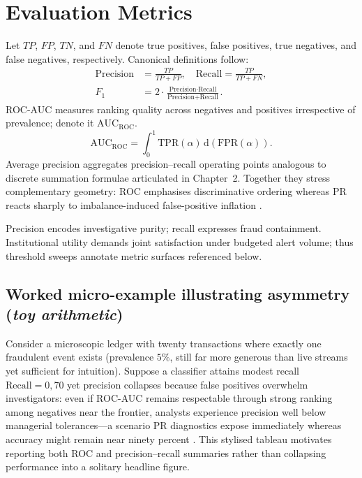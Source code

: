 \section{Evaluation Metrics}
Let $TP$, $FP$, $TN$, and $FN$ denote true positives, false positives, true negatives, and false negatives, respectively. Canonical definitions follow:
\begin{equation}
\begin{aligned}
\text{Precision} &= \frac{TP}{TP + FP},\quad
\text{Recall} = \frac{TP}{TP + FN},\\
F_1 &= 2 \cdot \frac{\text{Precision} \cdot \text{Recall}}{\text{Precision} + \text{Recall}} .
\end{aligned}
\end{equation}
ROC-AUC measures ranking quality across negatives and positives irrespective of prevalence; denote it $\mathrm{AUC}_{\mathrm{ROC}}$.
\begin{equation}
\mathrm{AUC}_{\mathrm{ROC}} = \int_0^1 \text{TPR}(\alpha)\, \mathrm{d}(\text{FPR}(\alpha)) .
\end{equation}
Average precision aggregates precision--recall operating points analogous to discrete summation formulae articulated in Chapter~2. Together they stress complementary geometry: ROC emphasises discriminative ordering whereas PR reacts sharply to imbalance-induced false-positive inflation \cite{fraud_handbook}.

Precision encodes investigative purity; recall expresses fraud containment. Institutional utility demands joint satisfaction under budgeted alert volume; thus threshold sweeps annotate metric surfaces referenced below.

\subsection{Worked micro-example illustrating asymmetry (\emph{toy arithmetic})}
Consider a microscopic ledger with twenty transactions where exactly one fraudulent event exists (prevalence $5\%$, still far more generous than live streams yet sufficient for intuition). Suppose a classifier attains modest recall $\text{Recall}=0{,}70$ yet precision collapses because false positives overwhelm investigators: even if ROC-AUC remains respectable through strong ranking among negatives near the frontier, analysts experience precision well below managerial tolerances—a scenario PR diagnostics expose immediately whereas accuracy might remain near ninety percent \cite{fraud_handbook,davis_goadrich_icml06}. This stylised tableau motivates reporting both ROC and precision--recall summaries rather than collapsing performance into a solitary headline figure.

